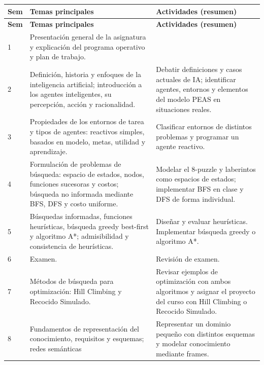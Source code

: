 \documentclass[12pt]{article}
\begin{document}
\setlength{\extrarowheight}{2pt}
\begin{longtable}{|>{\centering\arraybackslash}p{1.2cm}|p{7.2cm}|p{7.2cm}|}
	\hline
	\textbf{Sem} & \textbf{Temas principales} & \textbf{Actividades (resumen)} \\
	\hline
	\endfirsthead
	\hline
	\textbf{Sem} & \textbf{Temas principales} & \textbf{Actividades (resumen)} \\
	\hline
	\endhead
	
	1 &
	Presentación general de la asignatura y explicación del programa operativo y plan de trabajo. &
	 \\
	\hline
	
	2 &
	Definición, historia y enfoques de la inteligencia artificial; introducción a los agentes inteligentes, su percepción, acción y racionalidad. &
	Debatir definiciones y casos actuales de IA; identificar agentes, entornos y elementos del modelo PEAS en situaciones reales. \\
	\hline
	
	3 &
	Propiedades de los entornos de tarea y tipos de agentes: reactivos simples, basados en modelo, metas, utilidad y aprendizaje. &
	Clasificar entornos de distintos problemas y programar un agente reactivo. \\
	\hline
	
	4 &
	Formulación de problemas de búsqueda: espacio de estados, nodos, funciones sucesoras y costos; búsqueda no informada mediante BFS, DFS y costo uniforme. &
	Modelar el 8-puzzle y laberintos como espacios de estados; implementar BFS en clase y DFS de forma individual. \\
	\hline
	
	5 &
	Búsquedas informadas, funciones heurísticas, búsqueda greedy best-first y algoritmo A*; admisibilidad y consistencia de heurísticas. &
	Diseñar y evaluar heurísticas. Implementar búsqueda greedy o algoritmo A*. \\
	\hline
	
	6 &
	Examen. &
	Revisión de examen. \\
	\hline
	
	7 &
	Métodos de búsqueda para optimización: Hill Climbing y Recocido Simulado. &
	Revisar ejemplos de optimización con ambos algoritmos y asignar el proyecto del curso con Hill Climbing o Recocido Simulado. \\
	\hline
	
	8 &
	Fundamentos de representación del conocimiento, requisitos y esquemas; redes semánticas &
	Representar un dominio pequeño con distintos esquemas y modelar conocimiento mediante frames. \\
	\hline
	

\end{longtable}
\end{document}
